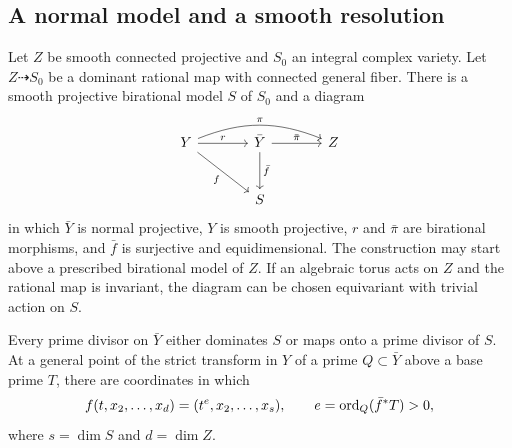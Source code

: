 \subsection{A normal model and a smooth resolution}

\begin{lemma}\label{lem:prepared-model}
Let $Z$ be smooth connected projective and $S_0$ an integral complex
variety. Let $Z\dashrightarrow S_0$ be a dominant rational map with connected
general fiber. There is a smooth projective birational model $S$ of
$S_0$ and a diagram
\[
\begin{tikzcd}[row sep=large,column sep=large]
Y\arrow[r,"r"]\arrow[dr,"f"']\arrow[rr,bend left=22,"\pi"]
 &\bar Y\arrow[r,"\bar\pi"]\arrow[d,"\bar f"]&Z\\
 &S&
\end{tikzcd}
\]
in which $\bar Y$ is normal projective, $Y$ is smooth projective,
$r$ and $\bar\pi$ are birational morphisms, and $\bar f$ is
surjective and equidimensional. The construction may start above a
prescribed birational model of $Z$. If an algebraic torus acts on $Z$
and the rational map is invariant, the diagram can be chosen
equivariant with trivial action on $S$.

Every prime divisor on $\bar Y$ either dominates $S$ or maps onto a
prime divisor of $S$. At a general point of the strict transform in
$Y$ of a prime $Q\subset\bar Y$ above a base prime $T$, there are
coordinates in which
\begin{equation}\label{eq:power-map}
 f(t,x_2,\ldots,x_d)=(t^e,x_2,\ldots,x_s),
 \qquad e=\operatorname{ord}_Q(\bar f^*T)>0,
\end{equation}
where $s=\dim S$ and $d=\dim Z$.
\end{lemma}

